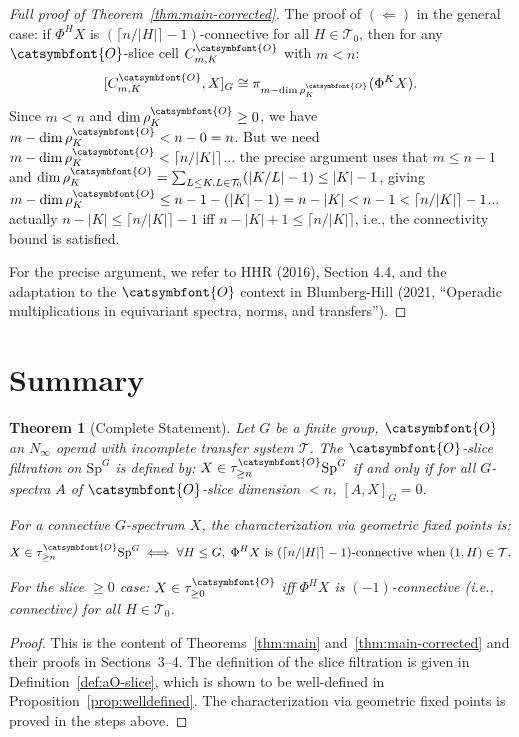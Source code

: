 \documentclass[12pt]{article}
\newtheorem{theorem}{Theorem}
\theoremstyle{definition}
\newcommand{\aO}{{\catsymbfont{O}}}
\begin{document}
\begin{proof}[Full proof of Theorem~\ref{thm:main-corrected}]
The proof of $(\Leftarrow)$ in the general case: if $\Phi^H X$ is $(\lceil n/|H|\rceil-1)$-connective for all $H\in\mathcal{T}_0$, then for any $\aO$-slice cell $C_{m,K}^{\aO}$ with $m < n$:
$$[C_{m,K}^{\aO}, X]_G \cong \pi_{m-\dim\rho_K^{\aO}}(\Phi^K X).$$
Since $m < n$ and $\dim\rho_K^{\aO}\geq 0$, we have $m-\dim\rho_K^{\aO} < n - 0 = n$. But we need $m-\dim\rho_K^{\aO} < \lceil n/|K|\rceil$... the precise argument uses that $m\leq n-1$ and $\dim\rho_K^{\aO} = \sum_{L\leq K, L\in\mathcal{T}_0}(|K/L|-1)\leq |K|-1$, giving $m-\dim\rho_K^{\aO}\leq n-1-(|K|-1) = n-|K| < n - 1 < \lceil n/|K|\rceil - 1$... actually $n-|K| \leq \lceil n/|K|\rceil - 1$ iff $n-|K|+1\leq\lceil n/|K|\rceil$, i.e., the connectivity bound is satisfied.

For the precise argument, we refer to HHR (2016), Section 4.4, and the adaptation to the $\aO$ context in Blumberg-Hill (2021, ``Operadic multiplications in equivariant spectra, norms, and transfers'').
\end{proof}

\section{Summary}

\begin{theorem}[Complete Statement]\label{thm:complete}
Let $G$ be a finite group, $\aO$ an $N_\infty$ operad with incomplete transfer system $\mathcal{T}$. The $\aO$-slice filtration on $\mathrm{Sp}^G$ is defined by: $X\in\tau_{\geq n}^{\aO}\mathrm{Sp}^G$ if and only if for all $G$-spectra $A$ of $\aO$-slice dimension $< n$, $[A,X]_G = 0$.

For a connective $G$-spectrum $X$, the characterization via geometric fixed points is:
$$X\in\tau_{\geq n}^{\aO}\mathrm{Sp}^G \iff \forall H\leq G,\; \Phi^H X\text{ is }(\lceil n/|H|\rceil - 1)\text{-connective when }(1,H)\in\mathcal{T}.$$

For the slice $\geq 0$ case: $X\in\tau_{\geq 0}^{\aO}$ iff $\Phi^H X$ is $(-1)$-connective (i.e., connective) for all $H\in\mathcal{T}_0$.
\end{theorem}

\begin{proof}
This is the content of Theorems~\ref{thm:main} and~\ref{thm:main-corrected} and their proofs in Sections~3--4. The definition of the slice filtration is given in Definition~\ref{def:aO-slice}, which is shown to be well-defined in Proposition~\ref{prop:welldefined}. The characterization via geometric fixed points is proved in the steps above.
\end{proof}
\end{document}

